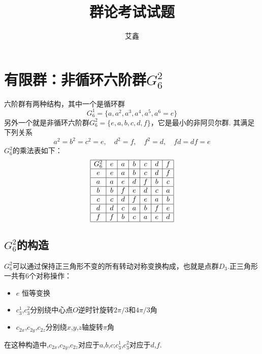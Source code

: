 \documentclass[UTF8]{ctexart}
\title{群论考试试题}
\author{艾鑫}
\begin{document}

\maketitle
\section{有限群：非循环六阶群$G_6^2$}
六阶群有两种结构，其中一个是循环群
\begin{equation}
G_6^1 = \{a,a^2,a^3,a^4,a^5,a^6=e\}
\end{equation}
另外一个就是非循环六阶群$G_6^2 = \{e,a,b,c,d,f\}$，它是最小的非阿贝尔群. 其满足下列关系
\begin{equation}
a^2=b^2=c^2=e, \quad d^2 = f, \quad f^2 = d, \quad fd = df = e
\end{equation}
$G_6^2$的乘法表如下：
\begin{equation}
\begin{array}{|c|c|c|c|c|c|c|}
\hline
G_6^2 & e & a & b & c & d & f \\
\hline
e & e & a & b & c & d & f \\
\hline
a & a & e & d & f & b & c \\
\hline
b & b & f & e & d & c & a \\
\hline
c & c & d & f & e & a & b \\
\hline
d & d & c & a & b & f & e \\
\hline
f & f & b & c & a & e & d \\
\hline
\end{array}
\end{equation}
\subsection{$G_6^2$的构造}

$G_6^2$可以通过保持正三角形不变的所有转动对称变换构成，也就是点群$D_3$.正三角形一共有6个对称操作：
\begin{itemize}
   \item $e$ 恒等变换
   \item $c_3^1$,$c_3^2$分别绕中心点$O$逆时针旋转$2\pi/3$和$4\pi/3$角
   \item $c_{2x}$,$c_{2y}$,$c_{2z}$分别绕$x$,$y$,$z$轴旋转$\pi$角
\end{itemize}
在这种构造中,$c_{2x}$,$c_{2y}$,$c_{2z}$对应于$a$,$b$,$c$;$c_3^1$,$c_3^2$对应于$d$,$f$.
\end{document}
